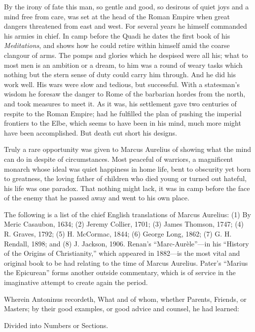 By the irony of fate this man, so gentle and good, so desirous of quiet joys
and a mind free from care, was set at the head of the Roman Empire when great
dangers threatened from east and west. For several years he himself commanded
his armies in chief. In camp before the Quadi he dates the first book of his
\emph{Meditations}, and shows how he could retire within himself amid the
coarse clangour of arms. The pomps and glories which he despised were all his;
what to most men is an ambition or a dream, to him was a round of weary tasks
which nothing but the stern sense of duty could carry him through. And he did
his work well. His wars were slow and tedious, but successful. With a
statesman's wisdom he foresaw the danger to Rome of the barbarian hordes from
the north, and took measures to meet it. As it was, his settlement gave two
centuries of respite to the Roman Empire; had he fulfilled the plan of pushing
the imperial frontiers to the Elbe, which seems to have been in his mind, much
more might have been accomplished. But death cut short his designs.

Truly a rare opportunity was given to Marcus Aurelius of showing what the mind
can do in despite of circumstances. Most peaceful of warriors, a magnificent
monarch whose ideal was quiet happiness in home life, bent to obscurity yet
born to greatness, the loving father of children who died young or turned out
hateful, his life was one paradox. That nothing might lack, it was in camp
before the face of the enemy that he passed away and went to his own place.

The following is a list of the chief English translations of Marcus Aurelius:
(1) By Meric Casaubon, 1634; (2) Jeremy Collier, 1701; (3) James Thomson, 1747;
(4) R. Graves, 1792; (5) H. McCormac, 1844; (6) George Long, 1862; (7) G. H.
Rendall, 1898; and (8) J. Jackson, 1906. Renan’s
“Marc-Aurèle”—in his “History of the Origins of
Christianity,” which appeared in 1882—is the most vital and
original book to be had relating to the time of Marcus Aurelius. Pater’s
“Marius the Epicurean” forms another outside commentary, which is
of service in the imaginative attempt to create again the period.



Wherein Antoninus recordeth, What and of whom, whether Parents, Friends,
or Masters; by their good examples, or good advice and counsel, he had
learned:

Divided into Numbers or Sections.


